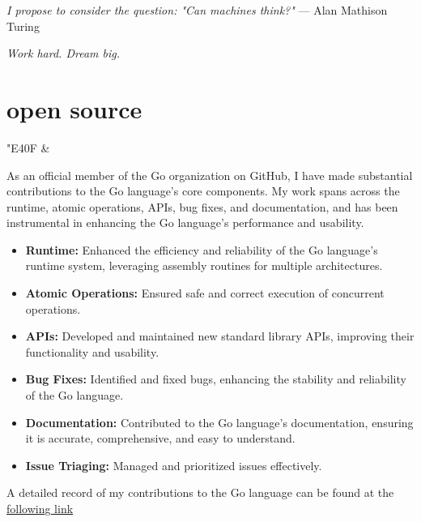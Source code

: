 \documentclass[]{cv-mauri}
\begin{document}

\textit{I propose to consider the question: "Can machines think?"} — Alan Mathison Turing

\textit{Work hard. Dream big.}

\section*{open source}
\begin{tabularcv}
	{\Huge \color[HTML]{76E1FE} \FAB \char"E40F} & 

		As an official member of the Go organization on GitHub, I have made substantial contributions to the Go language's core components. My work spans across the runtime, atomic operations, APIs, bug fixes, and documentation, and has been instrumental in enhancing the Go language's performance and usability.
		
		\begin{itemize}
			\item \textbf{Runtime:} Enhanced the efficiency and reliability of the Go language's runtime system, leveraging assembly routines for multiple architectures.
			\item \textbf{Atomic Operations:} Ensured safe and correct execution of concurrent operations.
			\item \textbf{APIs:} Developed and maintained new standard library APIs, improving their functionality and usability.
			\item \textbf{Bug Fixes:} Identified and fixed bugs, enhancing the stability and reliability of the Go language.
			\item \textbf{Documentation:} Contributed to the Go language's documentation, ensuring it is accurate, comprehensive, and easy to understand.
			\item \textbf{Issue Triaging:} Managed and prioritized issues effectively.
		\end{itemize}

		A detailed record of my contributions to the Go language can be found at the \color{maincolor}\href{https://go-review.googlesource.com/q/author:mauri870@gmail.com}{following link}
\end{tabularcv}
\end{document}
